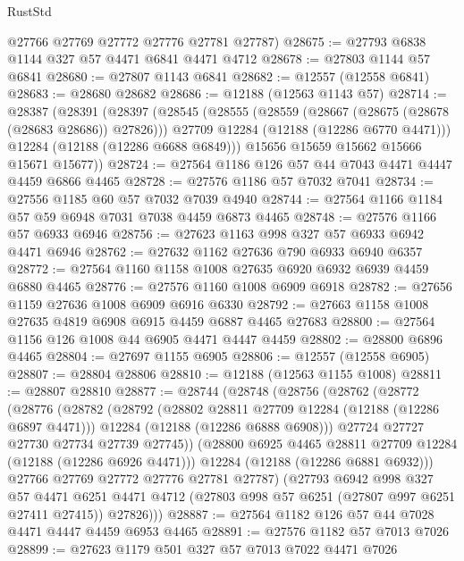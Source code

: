 \begin{lexlean}{RustStd}
\begin{coremodule}
      @27766
      @27769
      @27772
      @27776
      @27781
      @27787)
@28675 := @27793 @6838 @1144 @327 @57 @4471 @6841 @4471 @4712
@28678 := @27803 @1144 @57 @6841
@28680 := @27807 @1143 @6841
@28682 := @12557 (@12558 @6841)
@28683 := @28680 @28682
@28686 := @12188 (@12563 @1143 @57)
@28714 := @28387
    (@28391
      (@28397
        (@28545
          (@28555
            (@28559 (@28667 (@28675 (@28678 (@28683 @28686)) @27826)))
            @27709
            @12284
            (@12188 (@12286 @6770 @4471)))
          @12284
          (@12188 (@12286 @6688 @6849)))
        @15656
        @15659
        @15662
        @15666
        @15671
        @15677))
@28724 := @27564 @1186 @126 @57 @44 @7043 @4471 @4447 @4459 @6866 @4465
@28728 := @27576 @1186 @57 @7032 @7041
@28734 := @27556 @1185 @60 @57 @7032 @7039 @4940
@28744 := @27564 @1166 @1184 @57 @59 @6948 @7031 @7038 @4459 @6873 @4465
@28748 := @27576 @1166 @57 @6933 @6946
@28756 := @27623 @1163 @998 @327 @57 @6933 @6942 @4471 @6946
@28762 := @27632 @1162 @27636 @790 @6933 @6940 @6357
@28772 := @27564 @1160 @1158 @1008 @27635 @6920 @6932 @6939 @4459 @6880 @4465
@28776 := @27576 @1160 @1008 @6909 @6918
@28782 := @27656 @1159 @27636 @1008 @6909 @6916 @6330
@28792 := @27663 @1158 @1008 @27635 @4819 @6908 @6915 @4459 @6887 @4465 @27683
@28800 := @27564 @1156 @126 @1008 @44 @6905 @4471 @4447 @4459
@28802 := @28800 @6896 @4465
@28804 := @27697 @1155 @6905
@28806 := @12557 (@12558 @6905)
@28807 := @28804 @28806
@28810 := @12188 (@12563 @1155 @1008)
@28811 := @28807 @28810
@28877 := @28744
    (@28748
      (@28756
        (@28762
          (@28772
            (@28776
              (@28782
                (@28792
                  (@28802 @28811 @27709 @12284 (@12188 (@12286 @6897 @4471)))
                  @12284
                  (@12188 (@12286 @6888 @6908)))
                @27724
                @27727
                @27730
                @27734
                @27739
                @27745))
            (@28800 @6925 @4465 @28811 @27709 @12284 (@12188 (@12286 @6926 @4471)))
            @12284
            (@12188 (@12286 @6881 @6932)))
          @27766
          @27769
          @27772
          @27776
          @27781
          @27787)
        (@27793
          @6942
          @998
          @327
          @57
          @4471
          @6251
          @4471
          @4712
          (@27803 @998 @57 @6251 (@27807 @997 @6251 @27411 @27415))
          @27826)))
@28887 := @27564 @1182 @126 @57 @44 @7028 @4471 @4447 @4459 @6953 @4465
@28891 := @27576 @1182 @57 @7013 @7026
@28899 := @27623 @1179 @501 @327 @57 @7013 @7022 @4471 @7026

\end{coremodule}
\end{lexlean}
